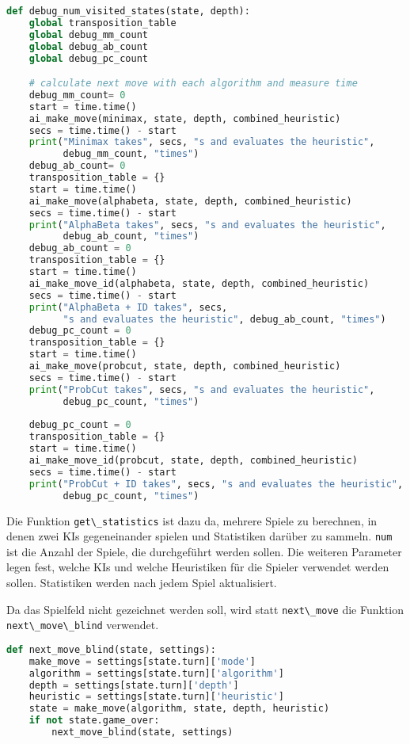 \begin{lstlisting}[language=Python]
def debug_num_visited_states(state, depth):
    global transposition_table
    global debug_mm_count
    global debug_ab_count
    global debug_pc_count

    # calculate next move with each algorithm and measure time
    debug_mm_count= 0
    start = time.time()
    ai_make_move(minimax, state, depth, combined_heuristic)
    secs = time.time() - start
    print("Minimax takes", secs, "s and evaluates the heuristic",
          debug_mm_count, "times")
    debug_ab_count= 0
    transposition_table = {}
    start = time.time()
    ai_make_move(alphabeta, state, depth, combined_heuristic)
    secs = time.time() - start
    print("AlphaBeta takes", secs, "s and evaluates the heuristic",
          debug_ab_count, "times")
    debug_ab_count = 0
    transposition_table = {}
    start = time.time()
    ai_make_move_id(alphabeta, state, depth, combined_heuristic)
    secs = time.time() - start
    print("AlphaBeta + ID takes", secs,
          "s and evaluates the heuristic", debug_ab_count, "times")
    debug_pc_count = 0
    transposition_table = {}
    start = time.time()
    ai_make_move(probcut, state, depth, combined_heuristic)
    secs = time.time() - start
    print("ProbCut takes", secs, "s and evaluates the heuristic",
          debug_pc_count, "times")
    
    debug_pc_count = 0
    transposition_table = {}
    start = time.time()
    ai_make_move_id(probcut, state, depth, combined_heuristic)
    secs = time.time() - start
    print("ProbCut + ID takes", secs, "s and evaluates the heuristic",
          debug_pc_count, "times")
\end{lstlisting}

Die Funktion \passthrough{\lstinline!get\_statistics!} ist dazu da,
mehrere Spiele zu berechnen, in denen zwei KIs gegeneinander spielen und
Statistiken darüber zu sammeln. \passthrough{\lstinline!num!} ist die
Anzahl der Spiele, die durchgeführt werden sollen. Die weiteren
Parameter legen fest, welche KIs und welche Heuristiken für die Spieler
verwendet werden sollen. Statistiken werden nach jedem Spiel
aktualisiert.

Da das Spielfeld nicht gezeichnet werden soll, wird statt
\passthrough{\lstinline!next\_move!} die Funktion
\passthrough{\lstinline!next\_move\_blind!} verwendet.

\begin{lstlisting}[language=Python]
def next_move_blind(state, settings):
    make_move = settings[state.turn]['mode']
    algorithm = settings[state.turn]['algorithm']
    depth = settings[state.turn]['depth']
    heuristic = settings[state.turn]['heuristic']
    state = make_move(algorithm, state, depth, heuristic)
    if not state.game_over:
        next_move_blind(state, settings)
\end{lstlisting}

